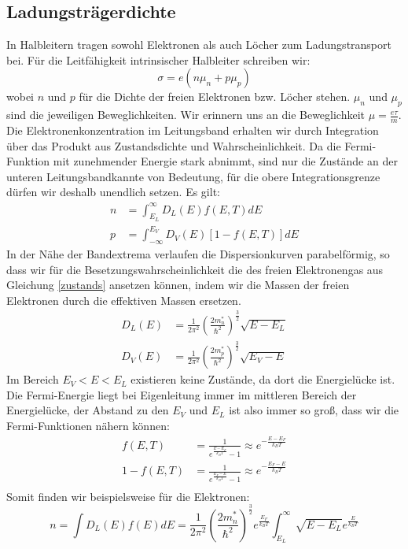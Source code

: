 \documentclass[11pt]{article}
\begin{document}
\subsection{Ladungsträgerdichte}
In Halbleitern tragen sowohl Elektronen als auch Löcher zum Ladungstransport bei.
Für die Leitfähigkeit intrinsischer Halbleiter schreiben wir:
\begin{equation}
  \sigma=e(n\mu_n+p\mu_p)
\end{equation}
wobei $n$ und $p$ für die Dichte der freien Elektronen bzw. Löcher stehen.
$\mu_n$ und $\mu_p$ sind die jeweiligen Beweglichkeiten.
Wir erinnern uns an die Beweglichkeit $\mu=\frac{e\tau}{m}$.
Die Elektronenkonzentration im Leitungsband erhalten wir durch Integration über
das Produkt aus Zustandsdichte und Wahrscheinlichkeit. Da die Fermi-Funktion mit
zunehmender Energie stark abnimmt, sind nur die Zustände an der unteren
Leitungsbandkannte von Bedeutung, für die obere Integrationsgrenze dürfen wir
deshalb unendlich setzen. Es gilt:
\begin{equation}
  \begin{align}
    n&=\int_{E_L}^{\infty}D_L(E)f(E,T)dE\\
    p&=\int_{-\infty}^{E_V}D_V(E)[1-f(E,T)]dE
  \end{align}
\end{equation}
In der Nähe der Bandextrema verlaufen die Dispersionkurven parabelförmig, so
dass wir für die Besetzungswahrscheinlichkeit die des freien Elektronengas aus
Gleichung \ref{zustands} ansetzen können, indem wir die Massen der freien
Elektronen durch die effektiven Massen ersetzen.
\begin{equation}
  \begin{align}
    D_L(E)&=\frac{1}{2\pi^2}\left(\frac{2m_n^*}{\hbar^2}\right)^{\frac{3}{2}}
    \sqrt{E-E_L}\\
    D_V(E)&=\frac{1}{2\pi^2}\left(\frac{2m_p^*}{\hbar^2}\right)^{\frac{3}{2}}
    \sqrt{E_V-E}
  \end{align}
\end{equation}
Im Bereich $E_V<E<E_L$ existieren keine Zustände, da dort die Energielücke ist.
Die Fermi-Energie liegt bei Eigenleitung immer im mittleren Bereich der
Energielücke, der Abstand zu den $E_V$ und $E_L$ ist also immer so groß, dass
wir die Fermi-Funktionen nähern können:
\begin{equation}
  \begin{align}
    f(E,T)&=\frac{1}{e^{\frac{E-E_F}{k_BT}}-1}\approx e^{-\frac{E-E_F}{k_BT}}\\
    1-f(E,T)&=\frac{1}{e^{\frac{E_F-E}{k_BT}}-1}\approx e^{-\frac{E_F-E}{k_BT}}\\
  \end{align}
\end{equation}
Somit finden wir beispielsweise für die Elektronen:
\begin{equation}
  n=\int D_L(E)f(E)dE=\frac{1}{2\pi^2}\left(\frac{2m_n^*}{\hbar^2}\right)^
  {\frac{3}{2}}e^{\frac{E_F}{k_BT}}\int_{E_L}^{\infty}\sqrt{E-E_L}
  e^{\frac{E}{k_BT}}
\end{equation}
\end{document}
